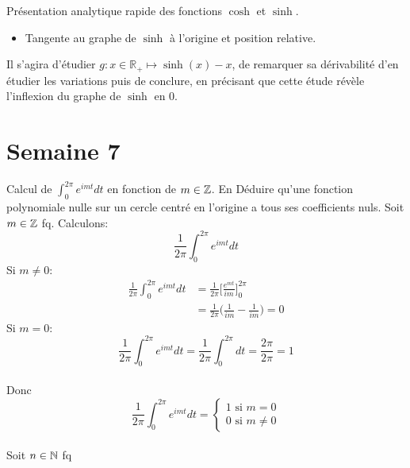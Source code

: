 \documentclass{article}
\begin{document}
\begin{question_kholle}{Présentation analytique rapide des fonctions \(\cosh\) et \(\sinh \).}
\begin{itemize}[label=$\bullet$]
		\
		
		\item Tangente au graphe de $\sinh$ à l'origine et position relative.
	\end{itemize}

	Il s'agira d'étudier $g : x\in \mathbb{R}_+ \mapsto \sinh(x) -x$, de remarquer sa dérivabilité d'en étudier les variations puis de conclure, en précisant que cette étude révèle l'inflexion du graphe de $\sinh$ en 0.
\end{question_kholle}

\pagebreak\section{Semaine 7}

\begin{question_kholle}{Calcul de $\int_0^{2\pi}e^{imt}dt$ en fonction de $m \in \mathbb Z$. En Déduire qu'une fonction polynomiale nulle sur un cercle centré en l'origine a tous ses coefficients nuls.}
	Soit $m \in \mathbb Z$ fq. Calculons:
	$$\frac{1}{2 \pi} \int_0^{2\pi}e^{imt}dt$$
	Si $m \neq 0$:
	\begin{align*}
		\frac{1}{2 \pi} \int_0^{2\pi}e^{imt}dt &= \frac{1}{2 \pi} \Big[ \frac{e^{mt}}{im} \Big]_0^{2\pi}\\
		&= \frac{1}{2 \pi} \Big( \frac{1}{im} - \frac{1}{im} \Big) = 0
	\end{align*}
	Si $m = 0$:
	$$
		\frac{1}{2 \pi} \int_0^{2\pi}e^{imt}dt = \frac{1}{2 \pi} \int_0^{2\pi}dt = \frac{2 \pi}{2 \pi} = 1
	$$
	\\
	Donc $$\frac{1}{2 \pi} \int_0^{2\pi}e^{imt}dt = 
	\begin{cases}
		1 \text{ si } m=0\\
		0 \text{ si } m \neq 0
	\end{cases}
	$$
	\\
	Soit $n\in \mathbb N$ fq
	

\end{question_kholle}
\end{document}
